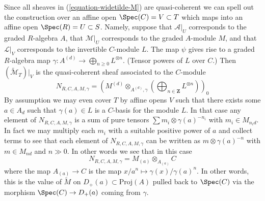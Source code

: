 \medskip\noindent
Since all sheaves in (\ref{equation-widetilde-M}) are quasi-coherent
we can spell out the construction
over an affine open $\Spec(C) = V \subset T$
which maps into an affine open $\Spec(R) = U \subset S$.
Namely, suppose that $\mathcal{A}|_U$ corresponds
to the graded $R$-algebra $A$, that $\mathcal{M}|_U$ corresponds to the
graded $A$-module $M$, and that $\mathcal{L}|_V$ corresponds to the
invertible $C$-module $L$. The map $\psi$ gives
rise to a graded $R$-algebra map
$\gamma : A^{(d)} \to \bigoplus_{n \geq 0} L^{\otimes n}$.
(Tensor powers of $L$ over $C$.)
Then $(\widetilde{\mathcal{M}}_T)|_V$
is the quasi-coherent sheaf associated to the $C$-module
$$
N_{R, C, A, M, \gamma} =
\left(
M^{(d)} \otimes_{A^{(d)}, \gamma}
\left(\bigoplus\nolimits_{n \in \mathbf{Z}} L^{\otimes n}\right)
\right)_0
$$
By assumption we may even cover $T$ by affine opens
$V$ such that there exists some $a \in A_d$ such that
$\gamma(a) \in L$ is a $C$-basis for the module $L$.
In that case any element of $N_{R, C, A, M, \gamma}$ is a sum
of pure tensors $\sum m_i \otimes \gamma(a)^{-n_i}$ with $m_i \in M_{n_id}$.
In fact we may multiply each $m_i$ with a suitable positive power
of $a$ and collect terms to see that each element of $N_{R, C, A, M, \gamma}$
can be written as $m \otimes \gamma(a)^{-n}$ with $m \in M_{nd}$ and
$n \gg 0$. In other words we see that in this case
$$
N_{R, C, A, M, \gamma} = M_{(a)} \otimes_{A_{(a)}} C
$$
where the map $A_{(a)} \to C$ is the map
$x/a^n \mapsto \gamma(x)/\gamma(a)^n$. In other words, this is
the value of $\widetilde{M}$ on $D_{+}(a) \subset \text{Proj}(A)$
pulled back to $\Spec(C)$ via the morphism
$\Spec(C) \to D_{+}(a)$ coming from $\gamma$.

